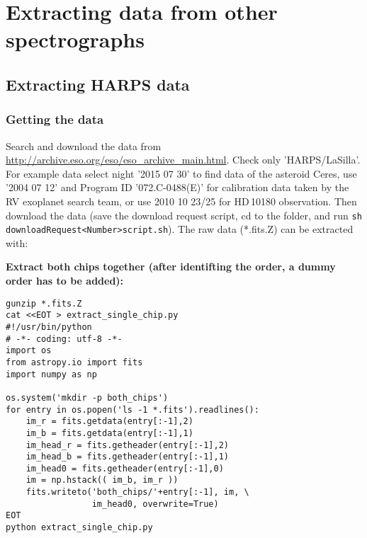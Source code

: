 \documentclass[10pt,a4paper]{article}
\begin{document}





\newpage
\section{Extracting data from other spectrographs}

\subsection{Extracting HARPS data}

\subsubsection{Getting the data}
Search and download the data from \url{http://archive.eso.org/eso/eso_archive_main.html}. Check only 'HARPS/LaSilla'. For example data select night '2015 07 30' to find data of the asteroid Ceres, use '2004 07 12' and Program ID '072.C-0488(E)' for calibration data taken by the RV exoplanet search team, or use 2010 10 23/25 for HD\,10180 observation. Then download the data (save the download request script, cd to the folder, and run \verb|sh  downloadRequest<Number>script.sh|). The raw data (*.fits.Z) can be extracted with:

\textbf{Extract both chips together (after identifting the order, a dummy order has to be added):}
\begin{lstlisting}[style=base]
gunzip *.fits.Z
cat <<EOT > extract_single_chip.py
#!/usr/bin/python
# -*- coding: utf-8 -*-
import os
from astropy.io import fits
import numpy as np

os.system('mkdir -p both_chips')
for entry in os.popen('ls -1 *.fits').readlines():
    im_r = fits.getdata(entry[:-1],2)
    im_b = fits.getdata(entry[:-1],1)
    im_head_r = fits.getheader(entry[:-1],2)
    im_head_b = fits.getheader(entry[:-1],1)
    im_head0 = fits.getheader(entry[:-1],0)
    im = np.hstack(( im_b, im_r ))
    fits.writeto('both_chips/'+entry[:-1], im, \
                 im_head0, overwrite=True)
EOT
python extract_single_chip.py
\end{lstlisting}
\end{document}
